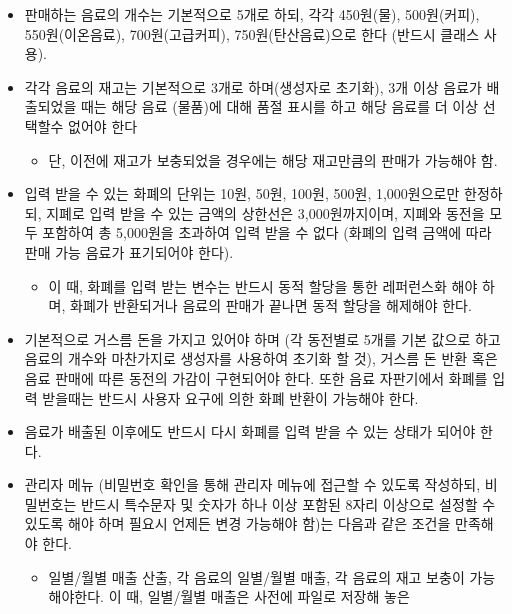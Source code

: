 \documentclass{oblivoir}
\begin{document}
    \begin{itemize}
        \item 판매하는 음료의 개수는 기본적으로 5개로 하되,
        각각 450원(물), 500원(커피), 550원(이온음료), 700원(고급커피),
        750원(탄산음료)으로 한다 (반드시 클래스 사용).
        \item 각각 음료의 재고는 기본적으로 3개로 하며(생성자로 초기화),
        3개 이상 음료가 배출되었을 때는 해당 음료 (물품)에 대해
        품절 표시를 하고 해당 음료를 더 이상 선택할수 없어야 한다
        \begin{itemize}
            \item 단, 이전에 재고가 보충되었을 경우에는 해당 재고만큼의 판매가 가능해야 함.
        \end{itemize}
        \item 입력 받을 수 있는 화폐의 단위는 10원, 50원, 100원, 500원,
        1,000원으로만 한정하되, 지폐로 입력 받을 수 있는 금액의
        상한선은 3,000원까지이며, 지폐와 동전을 모두 포함하여
        총 5,000원을 초과하여 입력 받을 수 없다
        (화폐의 입력 금액에 따라 판매 가능 음료가 표기되어야 한다).
        \begin{itemize}
            \item 이 때, 화폐를 입력 받는 변수는 반드시
            동적 할당을 통한 레퍼런스화 해야 하며,
            화폐가 반환되거나 음료의 판매가 끝나면
            동적 할당을 해제해야 한다.
        \end{itemize}
        \item 기본적으로 거스름 돈을 가지고 있어야 하며
        (각 동전별로 5개를 기본 값으로 하고 음료의 개수와 마찬가지로
        생성자를 사용하여 초기화 할 것),
        거스름 돈 반환 혹은 음료 판매에 따른 동전의
        가감이 구현되어야 한다.
        또한 음료 자판기에서 화폐를 입력 받을때는 반드시
        사용자 요구에 의한 화폐 반환이 가능해야 한다.
        \item 음료가 배출된 이후에도 반드시 다시 화폐를 입력 받을 수 있는
        상태가 되어야 한다.
        \item 관리자 메뉴 (비밀번호 확인을 통해 관리자 메뉴에 접근할
        수 있도록 작성하되, 비밀번호는 반드시 특수문자 및
        숫자가 하나 이상 포함된 8자리 이상으로 설정할 수 있도록 해야 하며
        필요시 언제든 변경 가능해야 함)는 다음과 같은 조건을 만족해야 한다.
        \begin{itemize}
            \item 일별/월별 매출 산출, 각 음료의 일별/월별 매출,
            각 음료의 재고 보충이 가능해야한다.
            이 때, 일별/월별 매출은 사전에 파일로 저장해 놓은

\end{itemize}
\end{itemize}
\end{document}
